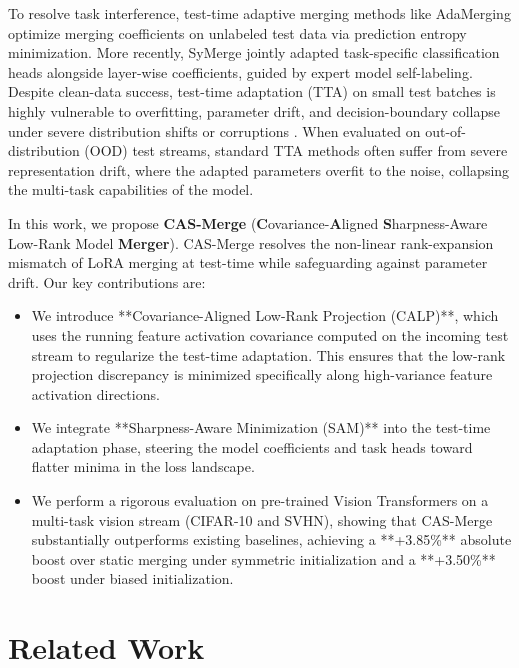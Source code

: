 \documentclass{article}
\begin{document}
To resolve task interference, test-time adaptive merging methods like AdaMerging \cite{yang2024adamerging} optimize merging coefficients on unlabeled test data via prediction entropy minimization. More recently, SyMerge \cite{jung2025symerge} jointly adapted task-specific classification heads alongside layer-wise coefficients, guided by expert model self-labeling. Despite clean-data success, test-time adaptation (TTA) on small test batches is highly vulnerable to overfitting, parameter drift, and decision-boundary collapse under severe distribution shifts or corruptions \cite{wang2021tent, liang2020shot, hendrycks2019robustness}. When evaluated on out-of-distribution (OOD) test streams, standard TTA methods often suffer from severe representation drift, where the adapted parameters overfit to the noise, collapsing the multi-task capabilities of the model.

In this work, we propose \textbf{CAS-Merge} (\textbf{C}ovariance-\textbf{A}ligned \textbf{S}harpness-Aware Low-Rank Model \textbf{Merger}). CAS-Merge resolves the non-linear rank-expansion mismatch of LoRA merging at test-time while safeguarding against parameter drift. Our key contributions are:
\begin{itemize}
    \item We introduce **Covariance-Aligned Low-Rank Projection (CALP)**, which uses the running feature activation covariance computed on the incoming test stream to regularize the test-time adaptation. This ensures that the low-rank projection discrepancy is minimized specifically along high-variance feature activation directions.
    \item We integrate **Sharpness-Aware Minimization (SAM)** \cite{foret2021sam} into the test-time adaptation phase, steering the model coefficients and task heads toward flatter minima in the loss landscape.
    \item We perform a rigorous evaluation on pre-trained Vision Transformers \cite{dosovitskiy2020vit} on a multi-task vision stream (CIFAR-10 and SVHN), showing that CAS-Merge substantially outperforms existing baselines, achieving a **+3.85\%** absolute boost over static merging under symmetric initialization and a **+3.50\%** boost under biased initialization.
\end{itemize}

\section{Related Work}
\label{related_work}
\end{document}
